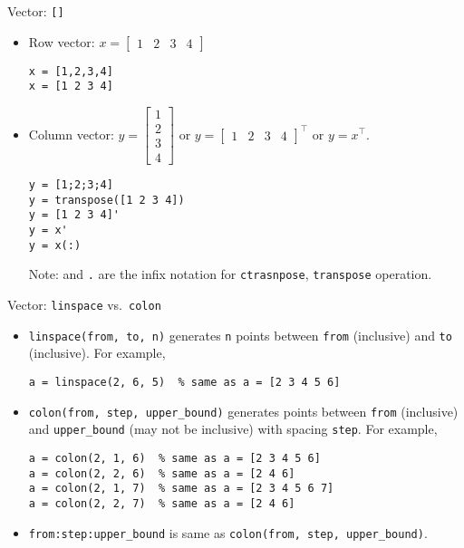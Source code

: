 \begin{frame}[fragile]{Vector: \texttt{{[}{]}}}
\protect\hypertarget{vector}{}
\begin{itemize}[<+->]
\item
  Row vector: \(x = \begin{bmatrix} 1 & 2 & 3 & 4 \end{bmatrix}\)

\begin{verbatim}
x = [1,2,3,4]
x = [1 2 3 4]
\end{verbatim}
\item
  Column vector: \(y = \begin{bmatrix} 1 \\ 2 \\ 3 \\ 4 \end{bmatrix}\)
  or \(y = \begin{bmatrix} 1 & 2 & 3 & 4\end{bmatrix}^{\top}\) or
  \(y = x^{\top}\).

\begin{verbatim}
y = [1;2;3;4]
y = transpose([1 2 3 4])
y = [1 2 3 4]'
y = x'
y = x(:)
\end{verbatim}

  Note: \texttt{\textquotesingle{}} and \texttt{.\textquotesingle{}} are
  the infix notation for \texttt{ctrasnpose}, \texttt{transpose}
  operation.
\end{itemize}
\end{frame}

\begin{frame}[fragile]{Vector: \texttt{linspace} vs.~\texttt{colon}}
\protect\hypertarget{vector-linspace-vs.-colon}{}
\begin{itemize}[<+->]
\item
  \texttt{linspace(from,\ to,\ n)} generates \texttt{n} points between
  \texttt{from} (inclusive) and \texttt{to} (inclusive). For example,

  \texttt{a\ =\ linspace(2,\ 6,\ 5)\ \ \%\ same\ as\ a\ =\ {[}2\ 3\ 4\ 5\ 6{]}}
\item
  \texttt{colon(from,\ step,\ upper\_bound)} generates points between
  \texttt{from} (inclusive) and \texttt{upper\_bound} (may not be
  inclusive) with spacing \texttt{step}. For example,

\begin{verbatim}
a = colon(2, 1, 6)  % same as a = [2 3 4 5 6]
a = colon(2, 2, 6)  % same as a = [2 4 6]
a = colon(2, 1, 7)  % same as a = [2 3 4 5 6 7]
a = colon(2, 2, 7)  % same as a = [2 4 6]
\end{verbatim}
\item
  \texttt{from:step:upper\_bound} is same as
  \texttt{colon(from,\ step,\ upper\_bound)}.
\end{itemize}
\end{frame}

